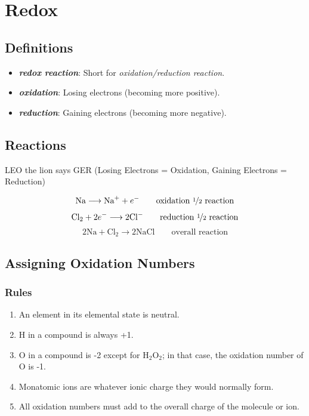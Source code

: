 \documentclass[a4paper, 12pt]{article}
\begin{document}
\section{Redox}

\subsection*{Definitions}

\begin{itemize}[leftmargin=*, nosep]
\item \textbf{\textit{redox reaction}}: Short for \textit{oxidation/reduction reaction}.
\item \textbf{\textit{oxidation}}: Losing electrons (becoming more positive).
\item \textbf{\textit{reduction}}: Gaining electrons (becoming more negative).
\end{itemize}

\subsection*{Reactions}
LEO the lion says GER (Losing Electrons = Oxidation, Gaining Electrons = Reduction)

$$\text{Na} \longrightarrow \text{Na}^+ + e^- \hspace{2em} \text{oxidation \nicefrac12 reaction}$$
$$\text{Cl}_2 + 2e^- \longrightarrow 2\text{Cl}^- \hspace{2em} \text{reduction \nicefrac12 reaction}$$
$$2\text{Na} + \text{Cl}_2 \longrightarrow 2\text{NaCl} \hspace{2em} \text{overall reaction}$$

\subsection*{Assigning Oxidation Numbers}

\subsubsection*{Rules}
\begin{enumerate}
\item An element in its elemental state is neutral.
\item H in a compound is always +1.
\item O in a compound is -2 except for H$_2$O$_2$; in that case, the oxidation number of O is -1.
\item Monatomic ions are whatever ionic charge they would normally form.
\item All oxidation numbers must add to the overall charge of the molecule or ion.
\end{enumerate}
\end{document}
